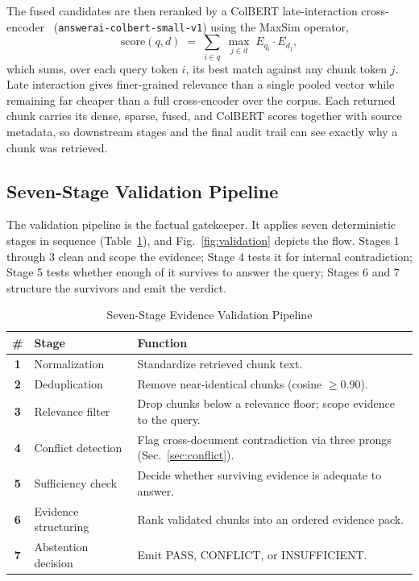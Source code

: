 \documentclass[conference]{IEEEtran}
\begin{document}
The fused candidates are then reranked by a ColBERT late-interaction
cross-encoder~\cite{khattab2020colbert} (\texttt{answerai-colbert-small-v1})
using the MaxSim operator,
\begin{equation}
\mathrm{score}(q,d) \;=\; \sum_{i \in q}\; \max_{j \in d}\;
E_{q_i} \cdot E_{d_j},
\label{eq:maxsim}
\end{equation}
which sums, over each query token $i$, its best match against any chunk
token $j$. Late interaction gives finer-grained relevance than a single
pooled vector while remaining far cheaper than a full cross-encoder over
the corpus. Each returned chunk carries its dense, sparse, fused, and
ColBERT scores together with source metadata, so downstream stages and the
final audit trail can see exactly why a chunk was retrieved.

\subsection{Seven-Stage Validation Pipeline}
\label{sec:validation}
The validation pipeline is the factual gatekeeper. It applies seven
deterministic stages in sequence (Table~\ref{tab:validation}), and
Fig.~\ref{fig:validation} depicts the flow. Stages 1 through 3 clean and
scope the evidence; Stage 4 tests it for internal contradiction; Stage 5
tests whether enough of it survives to answer the query; Stages 6 and 7
structure the survivors and emit the verdict.

\begin{table}[htbp]
\caption{Seven-Stage Evidence Validation Pipeline}
\label{tab:validation}
\centering
\small
\begin{tabularx}{\columnwidth}{@{}>{\bfseries}c l X@{}}
\toprule
\# & Stage & Function \\
\midrule
1 & Normalization      & Standardize retrieved chunk text. \\
2 & Deduplication      & Remove near-identical chunks (cosine $\geq 0.90$). \\
3 & Relevance filter   & Drop chunks below a relevance floor; scope evidence to the query. \\
4 & Conflict detection & Flag cross-document contradiction via three prongs (Sec.~\ref{sec:conflict}). \\
5 & Sufficiency check  & Decide whether surviving evidence is adequate to answer. \\
6 & Evidence structuring & Rank validated chunks into an ordered evidence pack. \\
7 & Abstention decision & Emit PASS, CONFLICT, or INSUFFICIENT. \\
\bottomrule
\end{tabularx}
\end{table}
\end{document}

